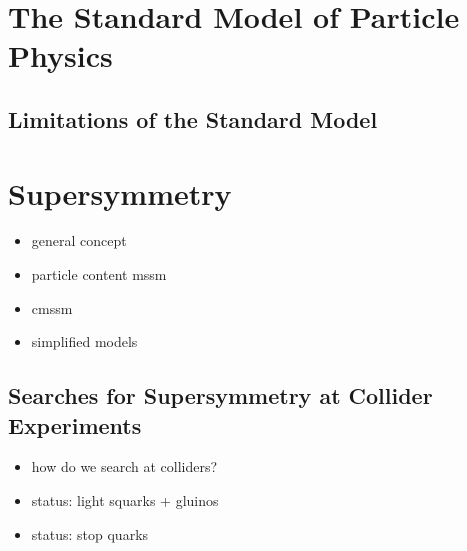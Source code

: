 \section{The Standard Model of Particle Physics}
\label{sec:sm}

\subsection{Limitations of the Standard Model}
\label{subsec:sm_shortcomings}

\section{Supersymmetry}
\label{sec:susy}

\begin{itemize}
\item general concept
\item particle content mssm
\item cmssm
\item simplified models
\end{itemize}


\subsection{Searches for Supersymmetry at Collider Experiments}
\label{subsec:susy_status}

\begin{itemize}
\item how do we search at colliders?
\item status: light squarks + gluinos
\item status: stop quarks
\end{itemize}

